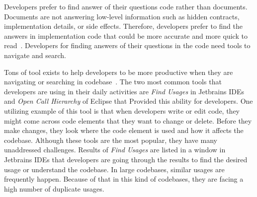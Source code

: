 \documentclass[conference]{IEEEtran}
\begin{document}
Developers prefer to find answer of their questions code rather than documents. Documents are not answering low-level information such as hidden contracts, implementation details, or side effects. Therefore, developers prefer to find the answers in implementation code that could be more accurate and more quick to read~\cite{head2018not}. Developers for finding answers of their questions in the code need tools to navigate and search.\par

Tons of tool exists to help developers to be more productive when they are navigating or searching in codebase~\cite{augustine2015field,ko2006exploratory,albusays2017interviews}. The two most common tools that developers are using in their daily activities are \textit{Find Usages} in Jetbrains IDEs and \textit{Open Call Hierarchy} of Eclipse that Provided this ability for developers. One utilizing example of this tool is that when developers write or edit code, they might come across code elements that they want to change or delete. Before they make changes, they look where the code element is used and how it affects the codebase. Although these tools are the most popular, they have many unaddressed challenges. Results of \textit{Find Usages} are listed in a window in Jetbrains IDEs that developers are going through the results to find the desired usage or understand the codebase. In large codebases, similar usages are frequently happen. Because of that in this kind of codebases, they are facing a high number of duplicate usages.\par


\end{document}
